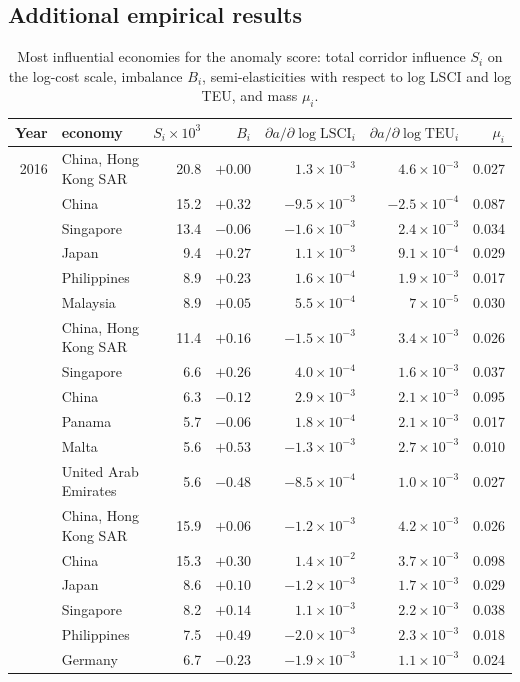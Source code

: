 \documentclass[12pt]{article}
\begin{document}
\subsection{Additional empirical results}

\begin{table}[h]
\caption{Most influential economies for the anomaly score: total corridor influence $S_i$ on the log-cost scale, imbalance $B_i$, semi-elasticities with respect to log LSCI and log TEU, and mass $\mu_i$.}\label{tab:sensnodes}
\centering\footnotesize
\begin{tabular}{rlrrrrr}
\toprule
Year & economy & $S_i\times10^{3}$ & $B_i$ & $\partial a/\partial\log\mathrm{LSCI}_i$ & $\partial a/\partial\log\mathrm{TEU}_i$ & $\mu_i$\\
\midrule
2016 & China, Hong Kong SAR & 20.8 & $+0.00$ & $1.3\times10^{-3}$ & $4.6\times10^{-3}$ & 0.027\\
 & China & 15.2 & $+0.32$ & $-9.5\times10^{-3}$ & $-2.5\times10^{-4}$ & 0.087\\
 & Singapore & 13.4 & $-0.06$ & $-1.6\times10^{-3}$ & $2.4\times10^{-3}$ & 0.034\\
 & Japan & 9.4 & $+0.27$ & $1.1\times10^{-3}$ & $9.1\times10^{-4}$ & 0.029\\
 & Philippines & 8.9 & $+0.23$ & $1.6\times10^{-4}$ & $1.9\times10^{-3}$ & 0.017\\
 & Malaysia & 8.9 & $+0.05$ & $5.5\times10^{-4}$ & $7\times10^{-5}$ & 0.030\\
\addlinespace
2020 & China, Hong Kong SAR & 11.4 & $+0.16$ & $-1.5\times10^{-3}$ & $3.4\times10^{-3}$ & 0.026\\
 & Singapore & 6.6 & $+0.26$ & $4.0\times10^{-4}$ & $1.6\times10^{-3}$ & 0.037\\
 & China & 6.3 & $-0.12$ & $2.9\times10^{-3}$ & $2.1\times10^{-3}$ & 0.095\\
 & Panama & 5.7 & $-0.06$ & $1.8\times10^{-4}$ & $2.1\times10^{-3}$ & 0.017\\
 & Malta & 5.6 & $+0.53$ & $-1.3\times10^{-3}$ & $2.7\times10^{-3}$ & 0.010\\
 & United Arab Emirates & 5.6 & $-0.48$ & $-8.5\times10^{-4}$ & $1.0\times10^{-3}$ & 0.027\\
\addlinespace
2021 & China, Hong Kong SAR & 15.9 & $+0.06$ & $-1.2\times10^{-3}$ & $4.2\times10^{-3}$ & 0.026\\
 & China & 15.3 & $+0.30$ & $1.4\times10^{-2}$ & $3.7\times10^{-3}$ & 0.098\\
 & Japan & 8.6 & $+0.10$ & $-1.2\times10^{-3}$ & $1.7\times10^{-3}$ & 0.029\\
 & Singapore & 8.2 & $+0.14$ & $1.1\times10^{-3}$ & $2.2\times10^{-3}$ & 0.038\\
 & Philippines & 7.5 & $+0.49$ & $-2.0\times10^{-3}$ & $2.3\times10^{-3}$ & 0.018\\
 & Germany & 6.7 & $-0.23$ & $-1.9\times10^{-3}$ & $1.1\times10^{-3}$ & 0.024\\
\bottomrule
\end{tabular}
\end{table}
\end{document}
